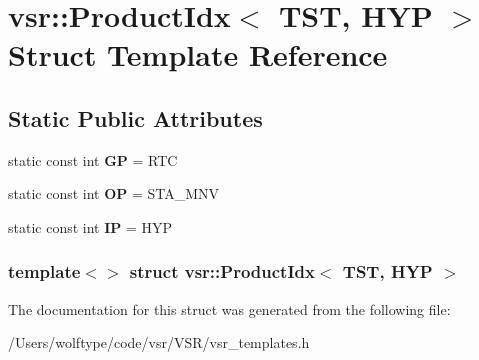 \hypertarget{structvsr_1_1_product_idx_3_01_t_s_t_00_01_h_y_p_01_4}{\section{vsr\-:\-:Product\-Idx$<$ T\-S\-T, H\-Y\-P $>$ Struct Template Reference}
\label{structvsr_1_1_product_idx_3_01_t_s_t_00_01_h_y_p_01_4}
}
\subsection*{Static Public Attributes}
\begin{DoxyCompactItemize}
\item 
\hypertarget{structvsr_1_1_product_idx_3_01_t_s_t_00_01_h_y_p_01_4_a4f47b9db203e93150c50a9ed6c6eb407}{static const int {\bfseries G\-P} = R\-T\-C}\label{structvsr_1_1_product_idx_3_01_t_s_t_00_01_h_y_p_01_4_a4f47b9db203e93150c50a9ed6c6eb407}

\item 
\hypertarget{structvsr_1_1_product_idx_3_01_t_s_t_00_01_h_y_p_01_4_a868dedeea3f15365722751791386f36b}{static const int {\bfseries O\-P} = S\-T\-A\-\_\-\-M\-N\-V}\label{structvsr_1_1_product_idx_3_01_t_s_t_00_01_h_y_p_01_4_a868dedeea3f15365722751791386f36b}

\item 
\hypertarget{structvsr_1_1_product_idx_3_01_t_s_t_00_01_h_y_p_01_4_af2ffc61400da07e51cd8b4db1173744f}{static const int {\bfseries I\-P} = H\-Y\-P}\label{structvsr_1_1_product_idx_3_01_t_s_t_00_01_h_y_p_01_4_af2ffc61400da07e51cd8b4db1173744f}

\end{DoxyCompactItemize}
\subsubsection*{template$<$$>$ struct vsr\-::\-Product\-Idx$<$ T\-S\-T, H\-Y\-P $>$}



The documentation for this struct was generated from the following file\-:\begin{DoxyCompactItemize}
\item 
/\-Users/wolftype/code/vsr/\-V\-S\-R/vsr\-\_\-templates.\-h\end{DoxyCompactItemize}
